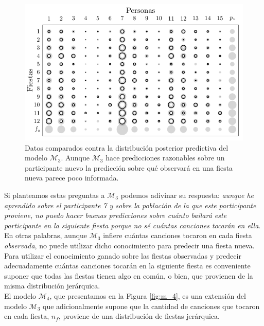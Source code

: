 \documentclass{article}
\begin{document}
\begin{figure}[H]
\centering
\setlength\fboxsep{0pt}
\setlength\fboxrule{0.5pt}
\includegraphics[trim=0cm 0cm 0cm 0cm, clip=true, width=1\textwidth]	{data_pos_pred_m3.pdf}
\caption{Datos comparados contra la distribución posterior predictiva del modelo $\mathcal M_3$. Aunque $\mathcal M_3$ hace predicciones razonables sobre un participante nuevo la predicción sobre qué observará en una fiesta nueva parece poco informada.}
\label{fig:data_3}
\end{figure}
	
\indent Si planteamos estas preguntas a $\mathcal M_3$ podemos adivinar su respuesta: \emph{aunque he aprendido sobre el participante 7 y sobre la población de la que este participante proviene, no puedo hacer buenas predicciones sobre cuánto bailará este participante en la siguiente fiesta porque no sé cuántas canciones tocarán en ella}. En otras palabras, aunque $\mathcal M_3$ infiere cuántas canciones tocaron en cada fiesta \emph{observada}, no puede utilizar dicho conocimiento para predecir una fiesta nueva. Para utilizar el conocimiento ganado sobre las fiestas observadas y predecir adecuadamente cuántas canciones tocarán en la siguiente fiesta es conveniente suponer que todas las fiestas tienen algo en común, o bien, que provienen de la misma distribución jerárquica.\\
	
\indent El modelo $\mathcal M_4$, que presentamos en la Figura \ref{fig:m_4}, es una extensión del modelo $\mathcal M_3$ que adicionalmente supone que la cantidad de canciones que tocaron en cada fiesta, $n_f$, proviene de una distribución de fiestas jerárquica. \\
\end{document}
